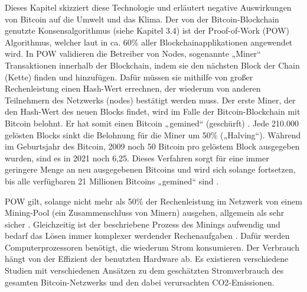 Dieses Kapitel skizziert diese Technologie und erläutert negative Auswirkungen von Bitcoin auf die Umwelt und das Klima. \newline
Der von der Bitcoin-Blockchain genutzte Konsensalgorithmus (siehe Kapitel 3.4) ist der Proof-of-Work (POW) Algorithmus, welcher laut \cite{andoni_blockchain_2019} in ca. 60\% aller Blockchainapplikationen angewendet wird.  In POW validieren die Betreiber von Nodes, sogenannte „Miner“ Transaktionen innerhalb der Blockchain, indem sie den nächsten Block der Chain (Kette) finden und hinzufügen. Dafür müssen sie mithilfe von großer Rechenleistung einen Hash-Wert errechnen, der wiederum von anderen Teilnehmern des Netzwerks (nodes) bestätigt werden muss. Der erste Miner, der den Hash-Wert des neuen Blocks findet, wird im Falle der Bitcoin-Blockchain mit Bitcoin belohnt. Er hat somit einen Bitcoin „gemined“ (geschürft) \cite{adam_konsensmodelle_2020}. Jede 210.000 gelösten Blocks sinkt die Belohnung für die Miner um 50\% („Halving“). Während im Geburtsjahr des Bitcoin, 2009 noch 50 Bitcoin pro gelöstem Block ausgegeben wurden, sind es in 2021 noch 6,25. Dieses Verfahren sorgt für eine immer geringere Menge an neu ausgegebenen Bitcoins und wird sich solange fortsetzen, bis alle verfügbaren 21 Millionen Bitcoins „gemined“ sind \cite{schar_understanding_2020}. \newline

POW gilt, solange nicht mehr als 50\% der Rechenleistung im Netzwerk von einem Mining-Pool (ein Zusammenschluss von Minern) ausgehen, allgemein als sehr sicher \cite{gervais_security_2016}. Gleichzeitig ist der beschriebene Prozess des Minings aufwendig und bedarf das Lösen immer komplexer werdender Rechenaufgaben \cite{stoll_carbon_2019}\cite{schinckus_good_2020}. Dafür werden Computerprozessoren benötigt, die wiederum Strom konsumieren. Der Verbrauch hängt von der Effizient der benutzten Hardware ab. Es existieren verschiedene Studien mit verschiedenen Ansätzen zu dem geschätzten Stromverbrauch des gesamten Bitcoin-Netzwerks und den dabei verursachten CO2-Emissionen. \newline

